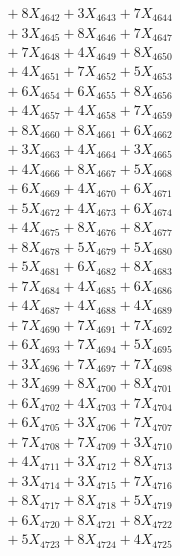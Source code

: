 \documentclass[a4paper,10pt]{article}
\begin{document}
{\begin{align}
&\;  + 8 X_{4642} + 3 X_{4643} + 7 X_{4644} \\[0.3ex]
&\;  + 3 X_{4645} + 8 X_{4646} + 7 X_{4647} \\[0.3ex]
&\;  + 7 X_{4648} + 4 X_{4649} + 8 X_{4650} \\[0.3ex]
&\;  + 4 X_{4651} + 7 X_{4652} + 5 X_{4653} \\[0.3ex]
&\;  + 6 X_{4654} + 6 X_{4655} + 8 X_{4656} \\[0.3ex]
&\;  + 4 X_{4657} + 4 X_{4658} + 7 X_{4659} \\[0.5ex]\allowbreak
&\;  + 8 X_{4660} + 8 X_{4661} + 6 X_{4662} \\[0.3ex]
&\;  + 3 X_{4663} + 4 X_{4664} + 3 X_{4665} \\[0.3ex]
&\;  + 4 X_{4666} + 8 X_{4667} + 5 X_{4668} \\[0.3ex]
&\;  + 6 X_{4669} + 4 X_{4670} + 6 X_{4671} \\[0.3ex]
&\;  + 5 X_{4672} + 4 X_{4673} + 6 X_{4674} \\[0.3ex]
&\;  + 4 X_{4675} + 8 X_{4676} + 8 X_{4677} \\[0.3ex]
&\;  + 8 X_{4678} + 5 X_{4679} + 5 X_{4680} \\[0.3ex]
&\;  + 5 X_{4681} + 6 X_{4682} + 8 X_{4683} \\[0.3ex]
&\;  + 7 X_{4684} + 4 X_{4685} + 6 X_{4686} \\[0.3ex]
&\;  + 4 X_{4687} + 4 X_{4688} + 4 X_{4689} \\[0.5ex]\allowbreak
&\;  + 7 X_{4690} + 7 X_{4691} + 7 X_{4692} \\[0.3ex]
&\;  + 6 X_{4693} + 7 X_{4694} + 5 X_{4695} \\[0.3ex]
&\;  + 3 X_{4696} + 7 X_{4697} + 7 X_{4698} \\[0.3ex]
&\;  + 3 X_{4699} + 8 X_{4700} + 8 X_{4701} \\[0.3ex]
&\;  + 6 X_{4702} + 4 X_{4703} + 7 X_{4704} \\[0.3ex]
&\;  + 6 X_{4705} + 3 X_{4706} + 7 X_{4707} \\[0.3ex]
&\;  + 7 X_{4708} + 7 X_{4709} + 3 X_{4710} \\[0.3ex]
&\;  + 4 X_{4711} + 3 X_{4712} + 8 X_{4713} \\[0.3ex]
&\;  + 3 X_{4714} + 3 X_{4715} + 7 X_{4716} \\[0.3ex]
&\;  + 8 X_{4717} + 8 X_{4718} + 5 X_{4719} \\[0.5ex]\allowbreak
&\;  + 6 X_{4720} + 8 X_{4721} + 8 X_{4722} \\[0.3ex]
&\;  + 5 X_{4723} + 8 X_{4724} + 4 X_{4725} \\[0.3ex]

\end{align}}
\end{document}
